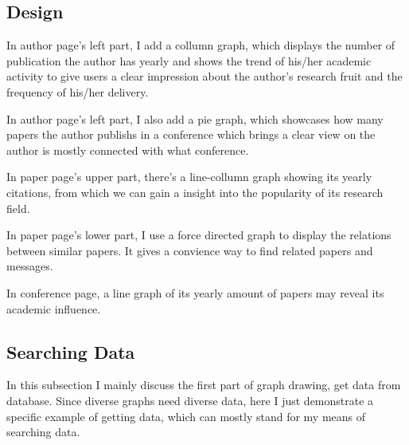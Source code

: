 \documentclass[10pt,twoside,a4paper,titlepage]{article}
\begin{document}
	\subsection{Design}
		\par In author page’s left part, I add a collumn graph, which displays the number of publication the author has yearly and
shows the trend of his/her academic activity to give users a clear impression about the author’s research fruit and the frequency of his/her delivery.
		\par In author page’s left part, I also add a pie graph, which showcases how many papers the author publishs in a conference which brings a clear view on the author is mostly connected with what conference.
		\par In paper page's upper part, there’s a line-collumn graph showing its yearly citations, from which we can gain a insight into the popularity of its research field.
		\par In paper page's lower part, I use a force directed graph to display the relations between similar papers. It gives a convience way to find related papers and messages.
		\par In conference page, a line graph of its yearly amount of papers may reveal its academic influence.

	\subsection{Searching Data}
		\par In this subsection I mainly discuss the first part of graph drawing, get data from database. Since diverse graphs need diverse data, here I just demonstrate a specific example of getting data, which can mostly stand for my means of searching data.
\end{document}
